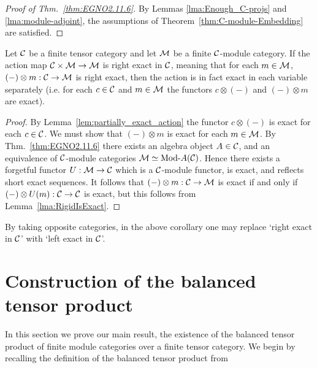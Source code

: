\documentclass{amsart}
\begin{document}
\begin{proof}[Proof of Thm.~\ref{thm:EGNO2.11.6}]
By Lemmas \ref{lma:Enough_C-projs} and \ref{lma:module-adjoint}, the assumptions of Theorem~\ref{thm:C-module-Embedding} are satisfied.
\end{proof}

\begin{corollary} \label{cor:biexact_action}
	Let $\mathcal C$ be a finite tensor category and let $\mathcal M$ be a finite $\mathcal C$-module category. If the action map $\mathcal C \times \mathcal M \to \mathcal M$ is right exact in $\mathcal C$, meaning that for each $m \in \mathcal M$, $(-) \otimes m: \mathcal C \to \mathcal M$ is right exact, then the action is in fact exact in each variable separately (i.e. for each $c \in \mathcal C$ and $m \in \mathcal M$ the functors $c \otimes (-)$ and $(-) \otimes m$ are exact).  
\end{corollary}

\begin{proof}
	By Lemma~\ref{lem:partially_exact_action} the functor $c \otimes (-)$ is exact for each $c \in \mathcal C$. We must show that $(-) \otimes m$ is exact for each $m \in \mathcal M$. By Thm.~\ref{thm:EGNO2.11.6} there exists an algebra object $A \in \mathcal C$, and an equivalence of $\mathcal C$-module categories $\cM \simeq \Mod{}{A}(\cC)$. Hence there exists a forgetful functor $U:\mathcal M \to \mathcal C$ which is a $\mathcal C$-module functor, is exact, and reflects short exact sequences. It follows that $(-) \otimes m: \mathcal C \to \mathcal M$ is exact if and only if $(-) \otimes U(m): \mathcal C \to \mathcal C$ is exact, but this follows from Lemma~\ref{lma:RigidIsExact}. 
\end{proof}

\begin{remark}
	By taking opposite categories, in the above corollary one may replace `right exact in $\mathcal C$' with `left exact in $\mathcal C$'. 
\end{remark}


\section{Construction of the balanced tensor product} \label{sec:tc-deligne}

In this section we prove our main result, the existence of the balanced tensor product of finite module categories over a finite tensor category.  We begin by recalling the definition of the balanced tensor product from \cite{0909.3140}
\end{document}
